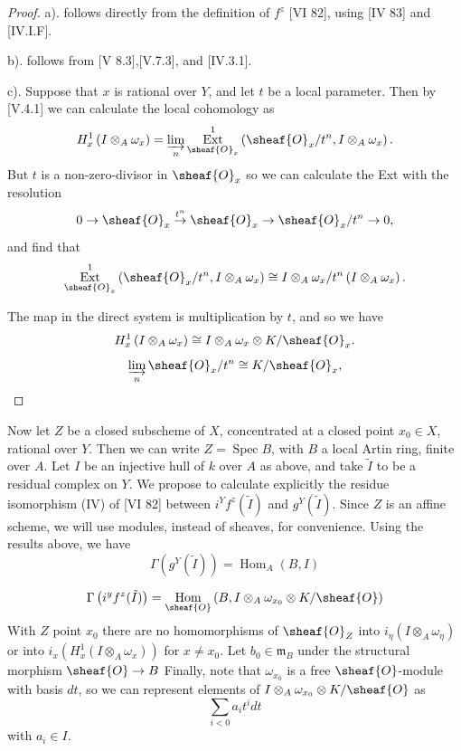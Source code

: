\documentclass[12pt]{book}
\DeclareMathOperator{\Spec}{Spec}
\DeclareMathOperator{\Hom}{Hom}
\DeclareMathOperator{\Ext}{Ext}
\begin{document}
\begin{proof}
a). follows directly from the definition of \(f^{z}\) [VI 82], using [IV 83] and [IV.I.F].

b). follows from [V 8.3],[V.7.3], and [IV.3.1].

c). Suppose that \(x\) is rational over \(Y\), and let \(t\) be a local parameter.
Then by [V.4.1] we can calculate the local cohomology as
\[
H_{x}^{1}\left(I \otimes_{A} \omega_{x}\right)=\varinjlim_{n} \Ext_{\sheaf{O}_{x}}^{1}\left(\sheaf{O}_{x} / t^{n}, I \otimes_{A} \omega_{x}\right) .
\]
But \(t\) is a non-zero-divisor in \(\sheaf{O}_{x}\) so we can calculate the Ext with the resolution
\[
0 \to \sheaf{O}_{x} \stackrel{t^{n}}{\to} \sheaf{O}_{x} \to \sheaf{O}_{x} / t^{n} \to 0,
\]
and find that
\[
\Ext_{\sheaf{O}_{x}}^{1}\left(\sheaf{O}_{x} / t^{n}, I \otimes_{A} \omega_{x}\right) \cong I \otimes_{A} \omega_{x} / t^{n}\left(I \otimes_{A} \omega_{x}\right) .
\]

\setcounter{page}{360}
The map in the direct system is multiplication by \(t\), and so we have
\[
H_{x}^{1}\left(I \otimes_{A} \omega_{x}\right) \cong I \otimes_{A} \omega_{x} \otimes K / \sheaf{O}_{x} .
\]
\[
\varinjlim_{n} \sheaf{O}_{x} / t^{n} \cong K / \sheaf{O}_{x} ,
\]
\end{proof}

Now let \(Z\) be a closed subscheme of \(X\), concentrated at a closed point \(x_{0} \in X\), rational over \(Y\).
Then we can write \(Z=\Spec B\), with \(B\) a local Artin ring, finite over \(A\).
Let \(I\) be an injective hull of \(k\) over \(A\) as above, and take \(\tilde{I}\) to be a residual complex on \(Y\).
We propose to calculate explicitly the residue isomorphism (IV) of [VI 82] between \(i^{Y} f^{z}(\tilde{I})\) and \(g^{Y}(\tilde{I})\).
Since \(Z\) is an affine scheme, we will use modules, instead of sheaves, for convenience.
Using the results above, we have
\[
\Gamma\left(g^{Y}(\tilde{I})\right)=\Hom_{A}(B, I)
\]

\setcounter{page}{361}
\[
\Gamma\left(i^{y} f^{z}(\tilde{I})\right)=\Hom_{\sheaf{O}}\left(B, I \otimes_{A} \omega_{x_{0}} \otimes K / \sheaf{O}\right)
\]
With \(Z\) point \(x_{0}\) there are no homomorphisms of \(\sheaf{O}_{Z}\) into \(i_{\eta}(I \otimes_{A} \omega_{\eta})\) or into \(i_{x}(H_{x}^{1}(I \otimes_{A} \omega_{x}))\) for \(x \neq x_{0}\).
Let \(b_{0} \in \mathfrak{m}_{B}\) under the structural morphism \(\sheaf{O} \to B\) Finally, note that \(\omega_{x_{0}}\) is a free \(\sheaf{O}\)-module with basis \(dt\), so we can represent elements of \(I \otimes_{A} \omega_{x_{0}} \otimes K / \sheaf{O}\) as
\[
\sum_{i<0} a_{i} t^{i} dt
\]
with \(a_{i} \in I\).
\end{document}
